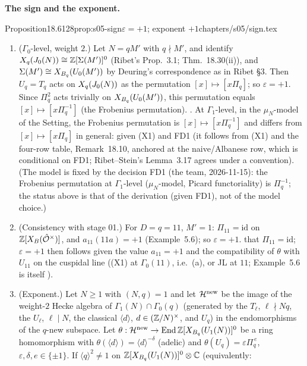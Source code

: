 \medskip\noindent\textbf{The sign and the exponent.}\par
\begin{quoted}{Proposition}{18.6}{128}{prop:s05-sign}{$\varepsilon=+1$; exponent $+1$}{chapters/s05/sign.tex}\label{rpt:prop:s05-sign}
\begin{enumerate}[label=(\alph*)]
\item ($\Gamma_0$-level, weight $2$.) Let $N=qM'$ with $q\nmid M'$, and identify $X_q(J_0(N))\cong\mathbb{Z}[\Sigma(M')]^0$ (Ribet's
  Prop.~3.1; Thm.~18.30(ii)), and $\Sigma(M')\cong X_{B_q}(U_0(M'))$ by Deuring's correspondence as in Ribet \S3. Then $U_q=T_q$ acts
  on $X_q(J_0(N))$ as the permutation $[x]\mapsto[x\Pi_q]$; so $\varepsilon=+1$. Since $\Pi_q^2$ acts trivially on
  $X_{B_q}(U_0(M'))$, this permutation equals $[x]\mapsto[x\Pi_q^{-1}]$ (the Frobenius permutation). \stpmc.
  At $\Gamma_1$-level, in the $\mu_N$-model of the Setting, the Frobenius permutation is $[x]\mapsto[x\Pi_q^{-1}]$ and differs from
  $[x]\mapsto[x\Pi_q]$ in general: \stpmc{} given (X1) and FD1 (it follows from (X1) and the four-row table, Remark~18.10, anchored at the naive/Albanese row, which is \stpmc{} conditional on FD1; Ribet--Stein's Lemma~3.17 agrees under a convention).
  (The model is fixed by the decision FD1 (the team, 2026-11-15): the Frobenius permutation at $\Gamma_1$-level ($\mu_N$-model, Picard functoriality) is $\Pi_q^{-1}$; the status \stpmc{} above is that of the derivation (given FD1), not of the model choice.)
\item (Consistency with stage 01.) For $D=q=11$, $M'=1$: $\Pi_{11}=\mathrm{id}$ on $\mathbb{Z}[X_B(\hat{\mathcal{O}}^\times)]$, and $a_{11}(11a)=+1$
  (Example~5.6); so $\varepsilon=+1$. \stproved{} that $\Pi_{11}=\mathrm{id}$; $\varepsilon=+1$ then follows given the \stknown{} value $a_{11}=+1$ and the compatibility of
  $\theta$ with $U_{11}$ on the cuspidal line ((X1) at $\Gamma_0(11)$, i.e.\ (a), or JL at $11$; Example~5.6 is itself \stpmc).
\item (Exponent.) Let $N\ge1$ with $(N,q)=1$ and let $\mathcal{H}^{\rm new}$ be the image of the weight-$2$ Hecke algebra of
  $\Gamma_1(N)\cap\Gamma_0(q)$ (generated by the $T_\ell$, $\ell\nmid Nq$, the $U_\ell$, $\ell\mid N$, the classical
  $\langle d\rangle$, $d\in(\mathbb{Z}/N)^\times$, and $U_q$) in the endomorphisms of the $q$-new subspace. Let
  $\theta:\mathcal{H}^{\rm new}\to\operatorname{End}\mathbb{Z}[X_{B_q}(U_1(N))]^0$ be a ring homomorphism with $\theta(\langle d\rangle)=\langle d\rangle^{-\delta}$ (adelic)
  and $\theta(U_q)=\varepsilon\Pi_q^{\,e}$, $\varepsilon,\delta,e\in\{\pm1\}$. If $\langle q\rangle^2\ne1$ on $\mathbb{Z}[X_{B_q}(U_1(N))]^0\otimes\mathbb{C}$ (equivalently:

\end{enumerate}
\end{quoted}
